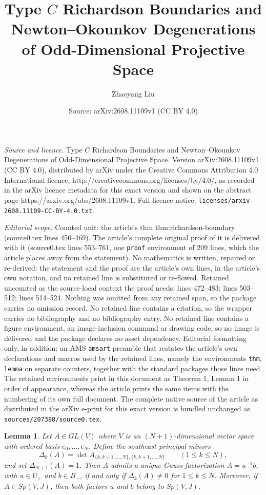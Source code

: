 \documentclass[10pt,a4paper]{amsart}
\title{Type \(C\) Richardson Boundaries and Newton--Okounkov Degenerations of Odd-Dimensional Projective Space}
\author{Zhaoyang Liu}
\date{Source: arXiv:2608.11109v1 (CC BY 4.0)}
\newtheorem{lemma}{Lemma}
\begin{document}
\maketitle

\noindent\emph{Source and licence.} Type \(C\) Richardson Boundaries and Newton--Okounkov Degenerations of Odd-Dimensional Projective Space. Version arXiv:2608.11109v1 (CC BY 4.0), distributed by arXiv under the Creative Commons Attribution 4.0 International licence, http://creativecommons.org/licenses/by/4.0/, as recorded in the arXiv licence metadata for this exact version and shown on the abstract page https://arxiv.org/abs/2608.11109v1. Full licence notice: \texttt{licenses/arxiv-2608.11109-CC-BY-4.0.txt}.\par\smallskip

\noindent\textit{Editorial scope.} Counted unit: the article's thm thm:richardson-boundary (source0.tex lines 450--469). The article's complete original proof of it is delivered with it (source0.tex lines 553--761, one \texttt{proof} environment of 209 lines, which the article places away from the statement). No mathematics is written, repaired or re-derived: the statement and the proof are the article's own lines, in the article's own notation, and no retained line is substituted or re-flowed.  Retained uncounted as the source-local context the proof needs: lines 472--483; lines 503--512; lines 514--524.  Nothing was omitted from any retained span, so the package carries no omission record.  No retained line contains a citation, so the wrapper carries no bibliography and no bibliography entry.  No retained line contains a figure environment, an image-inclusion command or drawing code, so no image is delivered and the package declares no asset dependency.  Editorial formatting only, in addition: an AMS \texttt{amsart} preamble that restates the article's own declarations and macros used by the retained lines, namely the environments \texttt{thm}, \texttt{lemma} on separate counters, together with the standard packages those lines need.  The retained environments print in this document as Theorem 1, Lemma 1 in order of appearance, whereas the article prints the same items with the numbering of its own full document.  The complete native source of the article as distributed in the arXiv e-print for this exact version is bundled unchanged as \texttt{sources/207388/source0.tex}.
\begin{lemma}\label{lem:southeast-elimination}
Let \(A\in GL(V)\) where \(V\) is an \((N+1)\)-dimensional vector space with ordered basis \(e_0,\dots,e_N\).
Define the southeast principal minors
\[
\Delta_k(A)=
\det A_{\{k,k+1,\dots,N\},\{k,k+1,\dots,N\}}
\qquad(1\le k\le N),
\]
and set \(\Delta_{N+1}(A)=1\).
Then \(A\) admits a unique Gauss factorization \(A=u^{-1}b\), with \(u\in U_+\) and \(b\in B_-\), if and only if \(\Delta_k(A)\neq 0\) for \(1\le k\le N\).
Moreover, if \(A\in Sp(V,J)\), then both factors \(u\) and \(b\) belong to \(Sp(V,J)\).
\end{lemma}
\end{document}

